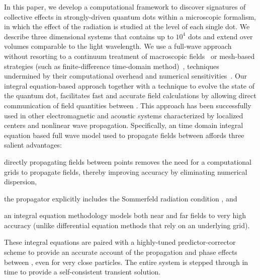 In this paper, we develop a computational framework to discover signatures of collective effects in strongly-driven quantum dots within a microscopic formalism, in which the effect of the radiation is studied at the level of each single dot.
We describe three dimensional systems that contains up to $10^4$ dots and extend over volumes comparable to the light wavelength. We use a full-wave approach without resorting to a continuum treatment of macroscopic fields~\cite{} or mesh-based strategies (such as finite-difference time-domain method)~\cite{Vanneste2001,Fratalocchi2008}, techniques undermined by their computational overhead and numerical sensitivities~\cite{Baczewski2013}.
Our integral equation-based approach together with a technique to evolve the  state of the  quantum dot, facilitates fast and accurate field calculations by allowing direct communication of field quantities between \qds{}.
This approach has been successfully used in other electromagnetic \cite{otherpapersfromshanker} and acoustic \cite{Glosser2016} systems characterized by localized centers and nonlinear wave propagation. Specifically, an time domain integral equation based full wave model used to propagate fields between \qds{} affords three salient advantages:
\begin{inparaenum}[(i)]
  \item directly propagating fields between points removes the need for a computational grids to propagate fields, thereby improving accuracy by eliminating numerical dispersion,
  \item the propagator explicitly includes the Sommerfeld radiation condition \cite{Stratton1948}, and
  \item an integral equation methodology models both near and far fields to very high accuracy (unlike differential equation methods that rely on an underlying grid).
\end{inparaenum}
These  integral equations are paired with a  highly-tuned predictor-corrector scheme to provide an accurate account of the propagation and phase effects between \qds{}, even for very close particles. The entire system is stepped through in time to provide a self-consistent transient solution. 

